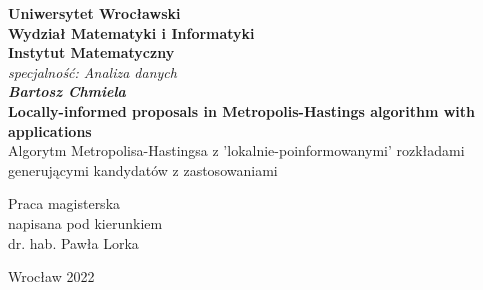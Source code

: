 \thispagestyle{empty}
\begin{center}
	\textbf{\large Uniwersytet Wroc\l{}awski\\
		Wydzia\l{} Matematyki i Informatyki\\
		Instytut Matematyczny}\\
	\textit{\large specjalno\'{s}\'{c}: Analiza danych}\\
	\vspace{4cm}
	\textbf{\textit{\large Bartosz Chmiela}\\
		\vspace{0.5cm}
		{\Large Locally-informed proposals in Metropolis-Hastings algorithm with applications}}\\
		\vspace{0.5cm}
		Algorytm Metropolisa-Hastingsa z 'lokalnie-poinformowanymi' rozkładami generującymi kandydatów z zastosowaniami
\end{center}
\vspace{3cm}
{\large \hspace*{6.5cm}Praca magisterska\\
	\hspace*{6.5cm}napisana pod kierunkiem\\
	\hspace*{6.5cm}dr. hab. Paw\l{}a Lorka }\\
\vfill
\begin{center}
	{\large Wroc\l{}aw 2022}\\
\end{center}
\restoregeometry  